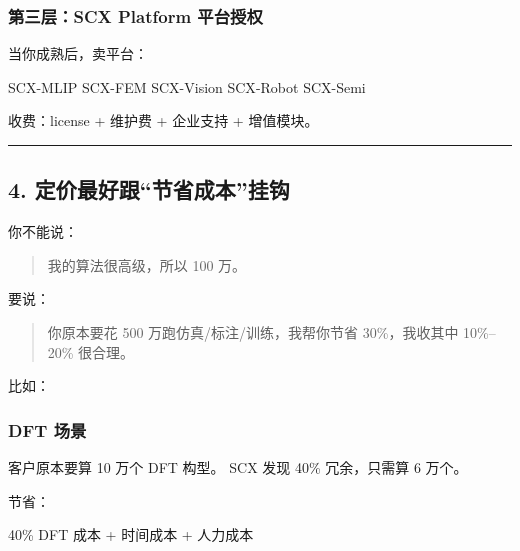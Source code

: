 \documentclass[
  12pt,
]{ctexart}
\newenvironment{Shaded}{}{}
\newcommand{\NormalTok}[1]{#1}
\begin{document}
\subsubsection{第三层：SCX Platform
平台授权}\label{ux7b2cux4e09ux5c42scx-platform-ux5e73ux53f0ux6388ux6743}

当你成熟后，卖平台：

\begin{Shaded}
\begin{Highlighting}[]
\NormalTok{SCX{-}MLIP}
\NormalTok{SCX{-}FEM}
\NormalTok{SCX{-}Vision}
\NormalTok{SCX{-}Robot}
\NormalTok{SCX{-}Semi}
\end{Highlighting}
\end{Shaded}

收费：license + 维护费 + 企业支持 + 增值模块。

\begin{center}\rule{0.5\linewidth}{0.5pt}\end{center}

\subsection{4.
定价最好跟``节省成本''挂钩}\label{ux5b9aux4ef7ux6700ux597dux8ddfux8282ux7701ux6210ux672cux6302ux94a9}

你不能说：

\begin{quote}
我的算法很高级，所以 100 万。
\end{quote}

要说：

\begin{quote}
你原本要花 500 万跑仿真/标注/训练，我帮你节省 30\%，我收其中 10\%--20\%
很合理。
\end{quote}

比如：

\subsubsection{DFT 场景}\label{dft-ux573aux666f}

客户原本要算 10 万个 DFT 构型。 SCX 发现 40\% 冗余，只需算 6 万个。

节省：

\begin{Shaded}
\begin{Highlighting}[]
\NormalTok{40\% DFT 成本 + 时间成本 + 人力成本}
\end{Highlighting}
\end{Shaded}
\end{document}
